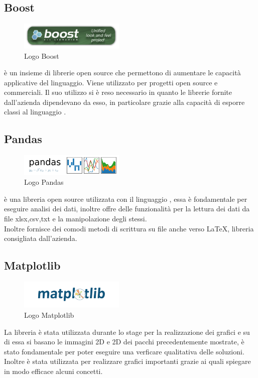 \subsection{Boost}
\begin{figure}[H]
	\begin{center} \includegraphics[width=5cm]{figures/boost}
		\caption[Logo Boost]{Logo Boost}
	\end{center}
\end{figure}
 è un insieme di librerie  open source che permettono di aumentare le capacità applicative del linguaggio. Viene utilizzato per progetti open source e commerciali. Il suo utilizzo si è reso necessario in quanto le librerie fornite dall'azienda dipendevano da esso, in particolare grazie alla capacità di esporre classi  al linguaggio .

\subsection{Pandas}
\begin{figure}[H]
	\begin{center} \includegraphics[width=5cm]{figures/pandas_logo}
		\caption[Logo Pandas]{Logo Pandas}
	\end{center}
\end{figure}
 è una libreria open source utilizzata con il linguaggio , essa è fondamentale per eseguire analisi dei dati, inoltre offre delle funzionalità per la lettura dei dati da file xlsx,csv,txt e la manipolazione degli stessi. \\
Inoltre fornisce dei comodi metodi di scrittura su file anche verso \LaTeX, libreria consigliata dall'azienda.

\subsection{Matplotlib}
\begin{figure}[H]
	\begin{center} \includegraphics[width=5cm]{figures/matplotlib-1}
		\caption[Logo Matplotlib]{Logo Matplotlib}
	\end{center}
\end{figure}
La libreria  è stata utilizzata durante lo stage per la realizzazione dei grafici e su di essa si basano le immagini 2D e 2D dei pacchi precedentemente mostrate, è stato fondamentale per poter eseguire una verficare qualitativa delle soluzioni. Inoltre è stata utilizzata per realizzare grafici importanti grazie ai quali spiegare in modo efficace alcuni concetti.

